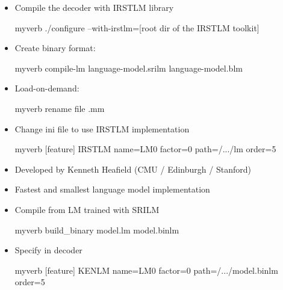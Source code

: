 \documentclass[landscape]{uedslides2C}
\begin{document}
\vspace{20mm}
\begin{itemize}
\item Compile the decoder with IRSTLM library \\
\begin{SaveVerbatim}{myverb} 
./configure --with-irstlm=[root dir of the IRSTLM toolkit] 
\end{SaveVerbatim}
\colorbox{gray}{}

\item Create binary format: \\[3mm]
\begin{SaveVerbatim}{myverb} 
compile-lm language-model.srilm language-model.blm
\end{SaveVerbatim}
\colorbox{gray}{}

\item Load-on-demand: \\[3mm]
\begin{SaveVerbatim}{myverb} 
rename file .mm  
\end{SaveVerbatim}
\colorbox{gray}{}

\item Change ini file to use IRSTLM implementation \\
\begin{SaveVerbatim}{myverb} 
[feature]
IRSTLM name=LM0 factor=0 path=/.../lm order=5
\end{SaveVerbatim}
\colorbox{gray}{}

\end{itemize}



\vspace{10mm}
\begin{itemize}
\item Developed by Kenneth Heafield (CMU / Edinburgh / Stanford)
\item Fastest and smallest language model implementation
\item Compile from LM trained with SRILM\\[5mm]
\begin{SaveVerbatim}{myverb} 
build_binary model.lm model.binlm
\end{SaveVerbatim}
\colorbox{gray}{}
\item Specify in decoder\\[5mm]
\begin{SaveVerbatim}{myverb} 
[feature]
KENLM name=LM0 factor=0 path=/.../model.binlm order=5
\end{SaveVerbatim}
\colorbox{gray}{}
\end{itemize}
\end{document}
